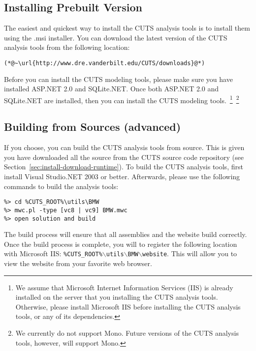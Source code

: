 \subsection{Installing Prebuilt Version}

The easiest and quickest way to install the CUTS analysis tools is to install
them using the .msi installer. You can download the latest version of the
CUTS analysis tools from the following location:
\begin{lstlisting}
(*@~\url{http://www.dre.vanderbilt.edu/CUTS/downloads}@*)
\end{lstlisting}
Before you can install the CUTS modeling tools, please make sure you have
installed ASP.NET 2.0 and SQLite.NET. Once both ASP.NET 2.0 and SQLite.NET are 
installed, then you can install the CUTS modeling tools.~\footnote{We assume that 
Microsoft Internet Information Services (IIS) is already installed on the server
that you installing the CUTS analysis tools. Otherwise, please install Microsoft
IIS before installing the CUTS analysis tools, or any of its dependencies.}~\footnote{We
currently do not support Mono. Future versions of the CUTS analysis tools, however, will
support Mono.}

\subsection{Building from Sources (advanced)}

If you choose, you can build the CUTS analysis tools from source. This is given 
you have downloaded all the source from the CUTS source code repository (see
Section~\ref{sec:install-download-runtime}). To build the CUTS analysis tools,
first install Visual Studio.NET 2003 or better. Afterwards, please use the following 
commands to build the analysis tools:
\begin{lstlisting}
%> cd %CUTS_ROOT%\utils\BMW
%> mwc.pl -type [vc8 | vc9] BMW.mwc
%> open solution and build
\end{lstlisting}
The build process will ensure that all assemblies and the website build correctly. 
Once the build process is complete, you will to register the following location
with Microsoft IIS: \texttt{\%CUTS\_ROOT\%$\backslash$utils$\backslash$BMW$\backslash$website}.
This will allow you to view the website from your favorite web browser.
\fi
